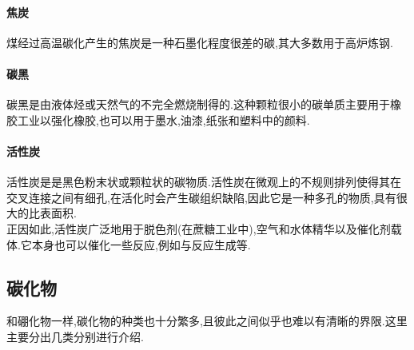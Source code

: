 \documentclass{ctexart}
\begin{document}
\paragraph{焦炭}
煤经过高温碳化产生的焦炭是一种石墨化程度很差的碳,其大多数用于高炉炼钢.
\paragraph{碳黑}
碳黑是由液体烃或天然气的不完全燃烧制得的.这种颗粒很小的碳单质主要用于橡胶工业以强化橡胶,也可以用于墨水,油漆,纸张和塑料中的颜料.
\paragraph{活性炭}
活性炭是是黑色粉末状或颗粒状的碳物质.活性炭在微观上的不规则排列使得其在交叉连接之间有细孔,在活化时会产生碳组织缺陷,因此它是一种多孔的物质,具有很大的比表面积.\\
\indent 正因如此,活性炭广泛地用于脱色剂(在蔗糖工业中),空气和水体精华以及催化剂载体.它本身也可以催化一些反应,例如与反应生成等.
\subsection{碳化物}
和硼化物一样,碳化物的种类也十分繁多,且彼此之间似乎也难以有清晰的界限.这里主要分出几类分别进行介绍.
\end{document}
